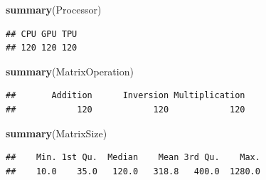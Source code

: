 \documentclass[
]{article}
\newenvironment{Shaded}{\begin{snugshade}}{\end{snugshade}}
\newcommand{\CommentTok}[1]{\textcolor[rgb]{0.56,0.35,0.01}{\textit{#1}}}
\newcommand{\DataTypeTok}[1]{\textcolor[rgb]{0.13,0.29,0.53}{#1}}
\newcommand{\DecValTok}[1]{\textcolor[rgb]{0.00,0.00,0.81}{#1}}
\newcommand{\KeywordTok}[1]{\textcolor[rgb]{0.13,0.29,0.53}{\textbf{#1}}}
\newcommand{\NormalTok}[1]{#1}
\newcommand{\OperatorTok}[1]{\textcolor[rgb]{0.81,0.36,0.00}{\textbf{#1}}}
\newcommand{\StringTok}[1]{\textcolor[rgb]{0.31,0.60,0.02}{#1}}
\begin{document}
\begin{Shaded}
\begin{Highlighting}[]
\KeywordTok{summary}\NormalTok{(Processor)}
\end{Highlighting}
\end{Shaded}

\begin{verbatim}
## CPU GPU TPU 
## 120 120 120
\end{verbatim}

\begin{Shaded}
\begin{Highlighting}[]
\KeywordTok{summary}\NormalTok{(MatrixOperation)}
\end{Highlighting}
\end{Shaded}

\begin{verbatim}
##       Addition      Inversion Multiplication 
##            120            120            120
\end{verbatim}

\begin{Shaded}
\begin{Highlighting}[]
\KeywordTok{summary}\NormalTok{(MatrixSize)}
\end{Highlighting}
\end{Shaded}

\begin{verbatim}
##    Min. 1st Qu.  Median    Mean 3rd Qu.    Max. 
##    10.0    35.0   120.0   318.8   400.0  1280.0
\end{verbatim}

\begin{Shaded}
\end{Shaded}
\end{document}
